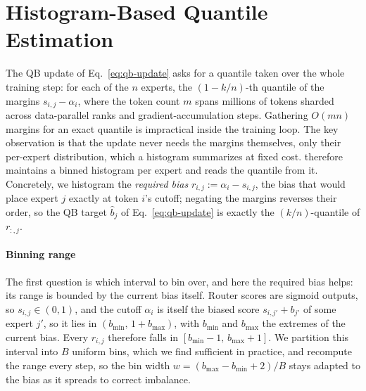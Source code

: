 \section{Histogram-Based Quantile Estimation}
\label{app:qb-histogram}

The QB update of Eq.~\ref{eq:qb-update} asks for a quantile taken over the whole training step: for each of the $n$ experts, the $(1-k/n)$-th quantile of the margins $s_{i,j}-\alpha_i$, where the token count $m$ spans millions of tokens sharded across data-parallel ranks and gradient-accumulation steps.
Gathering $O(mn)$ margins for an exact quantile is impractical inside the training loop.
The key observation is that the update never needs the margins themselves, only their per-expert distribution, which a histogram summarizes at fixed cost.
 therefore maintains a binned histogram per expert and reads the quantile from it.
Concretely, we histogram the \emph{required bias} $r_{i,j}:=\alpha_i-s_{i,j}$, the bias that would place expert $j$ exactly at token $i$'s cutoff; negating the margins reverses their order, so the QB target $\widehat{b}_j$ of Eq.~\ref{eq:qb-update} is exactly the $(k/n)$-quantile of $r_{:,j}$.

\paragraph{Binning range}
The first question is which interval to bin over, and here the required bias helps: its range is bounded by the current bias itself.
Router scores are sigmoid outputs, so $s_{i,j}\in(0,1)$, and the cutoff $\alpha_i$ is itself the biased score $s_{i,j'}+b_{j'}$ of some expert $j'$, so it lies in $(b_{\min},\,1+b_{\max})$, with $b_{\min}$ and $b_{\max}$ the extremes of the current bias.
Every $r_{i,j}$ therefore falls in $[b_{\min}-1,\,b_{\max}+1]$.
We partition this interval into $B$ uniform bins, which we find sufficient in practice, and recompute the range every step, so the bin width $w=(b_{\max}-b_{\min}+2)/B$ stays adapted to the bias as it spreads to correct imbalance.

